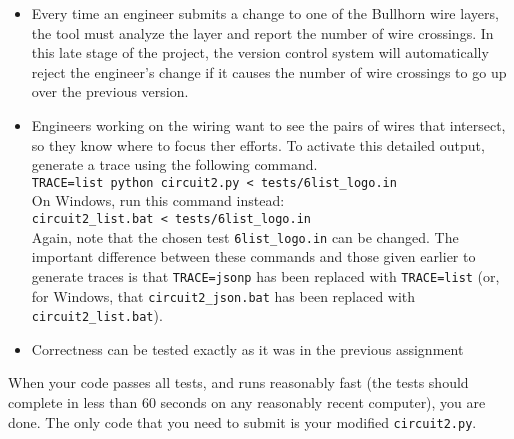 \documentclass[12pt,twoside]{article}
\begin{document}
\begin{problems}
\begin{problemparts}
\begin{itemize}
  \item Every time an engineer submits a change to one of the Bullhorn wire layers,
    the tool must analyze the layer and report the number of wire crossings. In this
    late stage of the project, the version control system will automatically reject
    the engineer’s change if it causes the number of wire crossings to go up over the
    previous version.
  \item Engineers working on the wiring want to see the pairs of wires that intersect, so they know where to focus ther efforts. To activate this detailed output, generate a trace using the following command.\\
  \texttt{TRACE=list python circuit2.py < tests/6list\_logo.in}\\
  On Windows, run this command instead:\\
  \texttt{circuit2\_list.bat < tests/6list\_logo.in}\\
  Again, note that the chosen test \texttt{6list\_logo.in} can be changed. The
  important difference between these commands and those given earlier to generate
  traces is that \texttt{TRACE=jsonp} has been replaced with \texttt{TRACE=list}
  (or, for Windows, that \texttt{circuit2\_json.bat} has been replaced with
  \texttt{circuit2\_list.bat}).
  \item Correctness can be tested exactly as it was in the previous assignment
\end{itemize}

When your code passes all tests, and runs reasonably fast (the tests should
complete in less than 60 seconds on any reasonably recent computer), you are
done. The only code that you need to submit is your modified \texttt{circuit2.py}.

\end{problemparts}

\end{problems}
\end{document}
